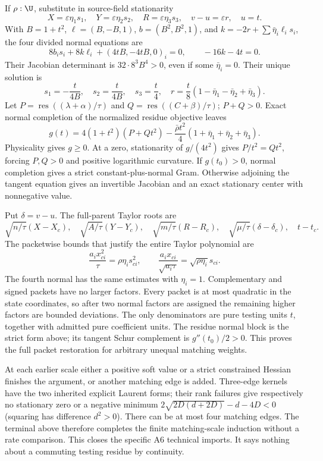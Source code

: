 If $\rho:\U$, substitute in source-field stationarity
\[
X=\varepsilon\eta_1s_1,\quad Y=\varepsilon\eta_2s_2,
\quad R=\varepsilon\eta_3s_3,\quad v-u=\varepsilon r,\quad u=t.
\]
With $B=1+t^2$, $\ell=(B,-B,1)$, $b=(B^2,B^2,1)$, and
$k=-2r+\sum\bar\eta_i\ell_i s_i$, the four divided normal equations
are
\[
8b_i s_i+8k\ell_i+(4tB,-4tB,0)_i=0,\qquad -16k-4t=0.
\]
Their Jacobian determinant is $32\cdot8^3B^4>0$, even if some
$\bar\eta_i=0$. Their unique solution is
\[
s_1=-\frac{t}{4B},\quad s_2=\frac{t}{4B},\quad s_3=\frac t4,
\quad r=\frac t8(1-\bar\eta_1-\bar\eta_2+\bar\eta_3).
\]
Let $P=\operatorname{res}((\lambda+\alpha)/\tau)$ and
$Q=\operatorname{res}((C+\beta)/\tau)$; $P+Q>0$. Exact normal
completion of the normalized residue objective leaves
\[
g(t)=4(1+t^2)(P+Qt^2)
 -\frac{\bar\rho t^2}{4}(1+\bar\eta_1+\bar\eta_2+\bar\eta_3).
\]
Physicality gives $g\ge0$. At a zero, stationarity of $g/(4t^2)$
gives $P/t^2=Qt^2$, forcing $P,Q>0$ and positive logarithmic curvature.
If $g(t_0)>0$, normal completion gives a strict constant-plus-normal
Gram. Otherwise adjoining the tangent equation gives an invertible
Jacobian and an exact stationary center with nonnegative value.

Put $\delta=v-u$. The full-parent Taylor roots are
\[
\sqrt{n/\tau}(X-X_c),\quad\sqrt{A/\tau}(Y-Y_c),\quad
\sqrt{m/\tau}(R-R_c),\quad\sqrt{\mu/\tau}(\delta-\delta_c),
\quad t-t_c.
\]
The packetwise bounds that justify the entire Taylor polynomial are
\[
\frac{a_i x_{ci}^2}{\tau}=\rho\eta_i s_{ci}^2,\qquad
\frac{a_i x_{ci}}{\sqrt{a_i\tau}}=\sqrt{\rho\eta_i}s_{ci}.
\]
The fourth normal has the same estimates with $\eta_i=1$. Complementary
and signed packets have no larger factors. Every packet is at most
quadratic in the state coordinates, so after two normal factors are
assigned the remaining higher factors are bounded deviations. The only
denominators are pure testing units $t$, together with admitted pure
coefficient units. The residue normal block is the strict form above;
its tangent Schur complement is $g''(t_0)/2>0$. This proves the full
packet restoration for arbitrary unequal matching weights.

At each earlier scale either a positive soft value or a strict constrained
Hessian finishes the argument, or another matching edge is added.
Three-edge kernels have the two inherited explicit Laurent forms; their
rank failures give respectively no stationary zero or a negative minimum
$2\sqrt{2D(d+2D)}-d-4D<0$ (squaring has difference $d^2>0$).
There can be at most four matching edges. The terminal above therefore
completes the finite matching-scale induction without a rate comparison.
This closes the specific A6 technical imports. It says nothing about a
commuting testing residue by continuity.

